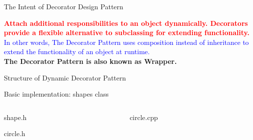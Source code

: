 \documentclass[13pt]{beamer}
\begin{document}
\begin{frame}{The Intent of Decorator Design Pattern}
	\begin{center}
	\textcolor{red}{\textbf{Attach additional responsibilities to an object dynamically. Decorators provide a flexible alternative to subclassing for extending functionality.}}\\
	\textcolor{blue}{In other words, The Decorator Pattern uses composition instead of inheritance to extend the functionality of an object at runtime.}\\
	\textbf{The Decorator Pattern is also known as Wrapper.}
	\end{center}
\end{frame}

\begin{frame}{Structure of Dynamic Decorator Pattern}
	\begin{center}
	\end{center}
\end{frame}

\begin{frame}{Basic implementation: shapes class}
\begin{columns}[T]
\begin{column}{.45\textwidth}
\lstset{basicstyle=\tiny,style=myCustomCppStyle}
shape.h

circle.h

\end{column}

\begin{column}{.45\textwidth}
\lstset{basicstyle=\tiny,style=myCustomCppStyle}
circle.cpp

\end{column}
\end{columns}
\end{frame}
\end{document}
